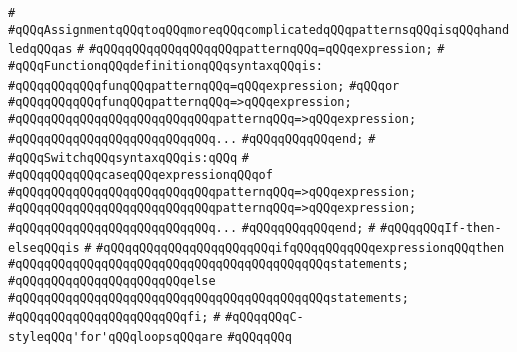 \verb|#|\newline
\verb|#qQQqAssignmentqQQqtoqQQqmoreqQQqcomplicatedqQQqpatternsqQQqisqQQqhandledqQQqas|\newline
\verb|#|\newline
\verb|#qQQqqQQqqQQqqQQqqQQqpatternqQQq=qQQqexpression;|\newline
\verb|#|\newline
\verb|#qQQqFunctionqQQqdefinitionqQQqsyntaxqQQqis:|\newline
\verb|#qQQqqQQqqQQqfunqQQqpatternqQQq=qQQqexpression;|\newline
\verb|#qQQqor|\newline
\verb|#qQQqqQQqqQQqfunqQQqpatternqQQq=>qQQqexpression;|\newline
\verb|#qQQqqQQqqQQqqQQqqQQqqQQqqQQqpatternqQQq=>qQQqexpression;|\newline
\verb|#qQQqqQQqqQQqqQQqqQQqqQQqqQQq...|\newline
\verb|#qQQqqQQqqQQqend;|\newline
\verb|#|\newline
\verb|#qQQqSwitchqQQqsyntaxqQQqis:qQQq|\newline
\verb|#|\newline
\verb|#qQQqqQQqqQQqcaseqQQqexpressionqQQqof|\newline
\verb|#qQQqqQQqqQQqqQQqqQQqqQQqqQQqpatternqQQq=>qQQqexpression;|\newline
\verb|#qQQqqQQqqQQqqQQqqQQqqQQqqQQqpatternqQQq=>qQQqexpression;|\newline
\verb|#qQQqqQQqqQQqqQQqqQQqqQQqqQQq...|\newline
\verb|#qQQqqQQqqQQqend;|\newline
\verb|#|\newline
\verb|#qQQqqQQqIf-then-elseqQQqis|\newline
\verb|#|\newline
\verb|#qQQqqQQqqQQqqQQqqQQqqQQqifqQQqqQQqqQQqexpressionqQQqthen|\newline
\verb|#qQQqqQQqqQQqqQQqqQQqqQQqqQQqqQQqqQQqqQQqqQQqstatements;|\newline
\verb|#qQQqqQQqqQQqqQQqqQQqqQQqelse|\newline
\verb|#qQQqqQQqqQQqqQQqqQQqqQQqqQQqqQQqqQQqqQQqqQQqstatements;|\newline
\verb|#qQQqqQQqqQQqqQQqqQQqqQQqfi;|\newline
\verb|#|\newline
\verb|#qQQqqQQqC-styleqQQq'for'qQQqloopsqQQqare|\newline
\verb|#qQQqqQQq|\newline
